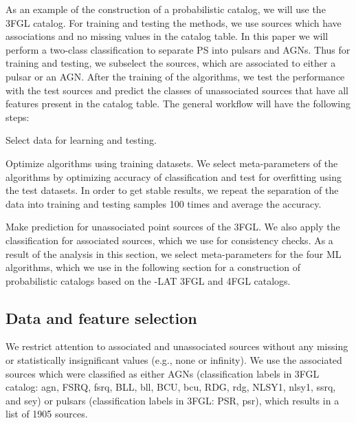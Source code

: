 As an example of the construction of a probabilistic catalog, we will use the 3FGL catalog.
For training and testing the methods, we use sources which have associations and no missing values in the catalog table.
In this paper we will perform a two-class classification to separate PS into pulsars and AGNs.
Thus for training and testing, we subselect the sources, which are associated to either a pulsar or an AGN.
After the training of the algorithms, we test the performance with the test sources and predict the classes of unassociated sources that have all features present in the catalog table.
The general workflow will have the following steps:
\ben
\item
Select data for learning and testing.
\item
Optimize algorithms using training datasets.
We select meta-parameters of the algorithms by optimizing accuracy of classification and test for overfitting using the test datasets.
In order to get stable results, we repeat the separation of the data into training and testing samples 100 times and 
average the accuracy.
\item
Make prediction for unassociated point sources of the 3FGL.
We also apply the classification for associated sources, which we use for consistency checks.
\een
As a result of the analysis in this section, we select meta-parameters for the four ML algorithms,
which we use in the following section for a construction of probabilistic catalogs
based on the \Fermi-LAT 3FGL and 4FGL catalogs.


\subsection{Data and feature selection}

We restrict attention to associated and unassociated sources without any missing or statistically insignificant values (e.g., none or infinity). 
We use the associated sources which were classified as either AGNs (classification labels in 3FGL catalog: agn, FSRQ, fsrq, BLL, bll, BCU, bcu, RDG, rdg, NLSY1, nlsy1, ssrq, and sey) or pulsars (classification labels in 3FGL: PSR, psr), which results in a list of 1905 sources. 

